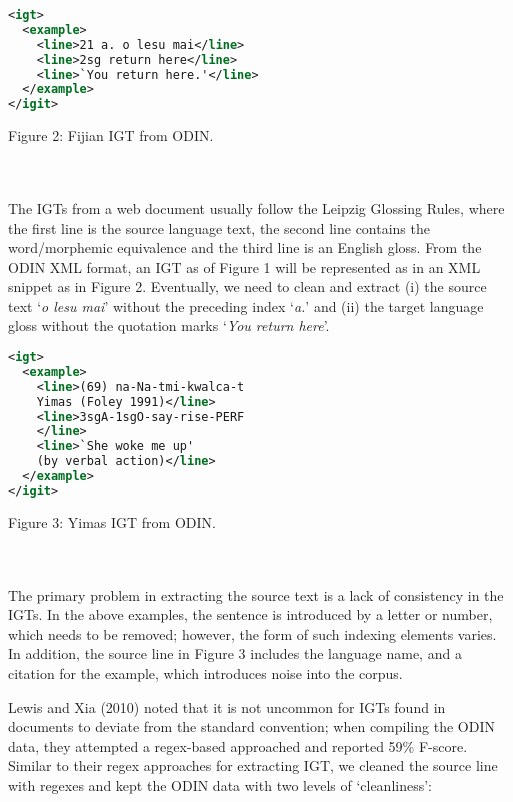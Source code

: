 \documentclass[11pt]{article}
\begin{document}
\begin{minipage}{\columnwidth} %
\begin{lstlisting}[language=XML]
<igt>
  <example>
    <line>21 a. o lesu mai</line>
    <line>2sg return here</line>
    <line>`You return here.'</line>
  </example>
</igit>
\end{lstlisting} 
\centerline{Figure 2: Fijian IGT from ODIN.}
\end{minipage}
\\ \\
\noindent The IGTs from a web document usually follow the Leipzig Glossing Rules, where the first line is the source language text, the second line contains the word/morphemic equivalence and the third line is an English gloss. From the ODIN XML format, an IGT as of Figure 1 will be represented as in an XML snippet as in Figure 2. Eventually, we need to clean and extract (i) the source text `\emph{o lesu mai}' without the preceding index `\emph{a.}' and (ii) the target language gloss without the quotation marks `\emph{You return here}'.
\begin{minipage}{\columnwidth}
\begin{lstlisting}[language=XML]
<igt>
  <example>
    <line>(69) na-Na-tmi-kwalca-t 
    Yimas (Foley 1991)</line>
    <line>3sgA-1sgO-say-rise-PERF
    </line>
    <line>`She woke me up' 
    (by verbal action)</line>
  </example>
</igit>
\end{lstlisting} 
\smallskip
\centerline{Figure 3: Yimas IGT from ODIN.}
\end{minipage}
\\ \\
\noindent The primary problem in extracting the source text is a lack of consistency in the IGTs. In the above examples, the sentence is introduced by a letter or number, which needs to be removed; however, the form of such indexing elements varies. In addition, the source line in Figure 3 includes the language name, and a citation for the example, which introduces noise into the corpus.

Lewis and Xia (2010) noted that it is not uncommon for IGTs found in documents to deviate from the standard convention; when compiling the ODIN data, they attempted a regex-based approached and reported 59\% F-score. Similar to their regex approaches for extracting IGT, we cleaned the source line with regexes and kept the ODIN data with two levels of `cleanliness':
\end{document}
